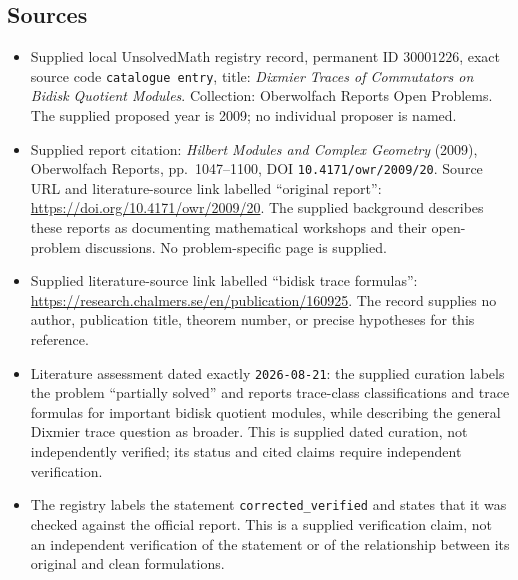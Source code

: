 \documentclass[11pt]{article}
\begin{document}
\subsection{Sources}
\begin{itemize}
\item Supplied local UnsolvedMath registry record, permanent ID \(30001226\), exact source code \texttt{catalogue entry}, title: \emph{Dixmier Traces of Commutators on Bidisk Quotient Modules}. Collection: Oberwolfach Reports Open Problems. The supplied proposed year is 2009; no individual proposer is named.
\item Supplied report citation: \emph{Hilbert Modules and Complex Geometry} (2009), Oberwolfach Reports, pp.\ 1047--1100, DOI \texttt{10.4171/owr/2009/20}. Source URL and literature-source link labelled ``original report'': \url{https://doi.org/10.4171/owr/2009/20}. The supplied background describes these reports as documenting mathematical workshops and their open-problem discussions. No problem-specific page is supplied.
\item Supplied literature-source link labelled ``bidisk trace formulas'': \url{https://research.chalmers.se/en/publication/160925}. The record supplies no author, publication title, theorem number, or precise hypotheses for this reference.
\item Literature assessment dated exactly \texttt{2026-08-21}: the supplied curation labels the problem ``partially solved'' and reports trace-class classifications and trace formulas for important bidisk quotient modules, while describing the general Dixmier trace question as broader. This is supplied dated curation, not independently verified; its status and cited claims require independent verification.
\item The registry labels the statement \texttt{corrected\_verified} and states that it was checked against the official report. This is a supplied verification claim, not an independent verification of the statement or of the relationship between its original and clean formulations.
\end{itemize}
\end{document}
